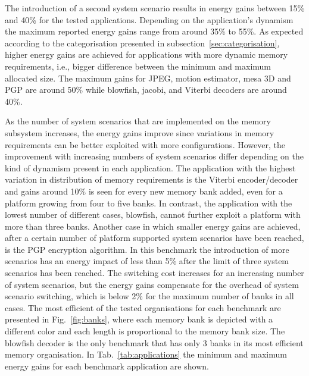 \documentclass[a4paper,conference]{IEEEtran}
\begin{document}
The introduction of a second system scenario results in energy gains between 15\% and  40\%  for the tested applications. Depending on the application's dynamism the maximum reported energy gains range from around 35\% to 55\%. As expected according to the categorisation presented in subsection~\ref{sec:categorisation}, higher energy gains are achieved for applications with more dynamic memory requirements, i.e., bigger difference between the minimum and maximum allocated size. The maximum gains for JPEG, motion estimator, mesa 3D and PGP are around 50\% while blowfish, jacobi, and Viterbi decoders are around 40\%.

As the number of system scenarios that are implemented on the memory subsystem increases, the energy gains improve since variations in memory requirements can be better exploited with more configurations. However, the improvement with increasing numbers of system scenarios differ depending on the kind of dynamism present in each application. The application with the highest variation in distribution of memory requirements is the Viterbi encoder/decoder and gains around 10\% is seen for every new memory bank added, even for a platform growing from four to five banks. In contrast, the application with the lowest number of different cases, blowfish, cannot further exploit a platform with more than three banks. Another case in which smaller energy gains are achieved, after a certain number of platform supported system scenarios have been reached, is the PGP encryption algorithm. In this benchmark the introduction of more scenarios has an energy impact of less than 5\% after the limit of three system scenarios has been reached. The switching cost increases for an increasing number of system scenarios, but the energy gains compensate for the overhead of system scenario switching, which is below 2\% for the maximum number of banks in all cases. The most efficient of the tested organisations for each benchmark are presented in Fig.~\ref{fig:banks}, where each memory bank is depicted with a different color and each length is proportional to the memory bank size. The blowfish decoder is the only benchmark that has only 3 banks in its most efficient memory organisation. In Tab.~\ref{tab:applications} the minimum and maximum energy gains for each benchmark application are shown. 
\end{document}
